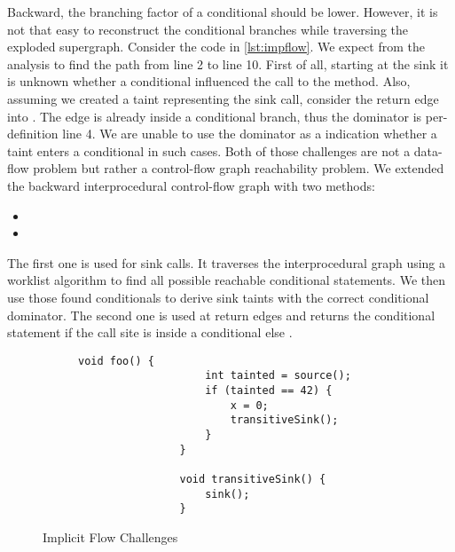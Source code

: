 \documentclass[../draft.tex]{subfiles}
\begin{document}
    Backward, the branching factor of a conditional should be lower. However, it is not that easy to reconstruct the conditional branches while traversing the exploded supergraph. 
    Consider the code in \autoref{lst:impflow}. 
    We expect from the analysis to find the path from line 2 to line 10. 
    First of all, starting at the sink it is unknown whether a conditional influenced the call to the  method. 
    Also, assuming we created a taint representing the sink call, consider the return edge into . 
    The edge is already inside a conditional branch, thus the dominator is per-definition line 4. 
    We are unable to use the dominator as a indication whether a taint enters a conditional in such cases.
    Both of those challenges are not a data-flow problem but rather a control-flow graph reachability problem. We extended the backward interprocedural control-flow graph with two methods:
    \begin{itemize}
        \item {}
        \item {}
    \end{itemize}
    The first one is used for sink calls. It traverses the interprocedural graph using a worklist algorithm to find all possible reachable conditional statements. We then use those found conditionals to derive sink taints with the correct conditional dominator.
    The second one is used at return edges and returns the conditional statement if the call site is inside a conditional else . 
    
    \begin{figure}[tbp]
        \centering
        \begin{subfigure}[b]{0.45\textwidth}
            \centering
            \begin{lstlisting}[gobble=16]
                void foo() {
                    int tainted = source();
                    if (tainted == 42) {
                        x = 0;
                        transitiveSink();
                    }
                }

                void transitiveSink() {
                    sink();
                }
            \end{lstlisting}
        \end{subfigure}
        \caption{Implicit Flow Challenges}
        \label{lst:impflow}
    \end{figure}
\end{document}
